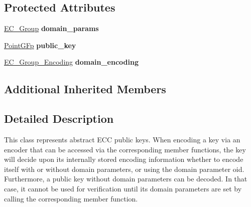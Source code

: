 \subsection*{Protected Attributes}
\begin{DoxyCompactItemize}
\item 
\hypertarget{classBotan_1_1EC__PublicKey_a7b8f5a600f52f9198b57f4015a3e243e}{\hyperlink{classBotan_1_1EC__Group}{E\-C\-\_\-\-Group} {\bfseries domain\-\_\-params}}\label{classBotan_1_1EC__PublicKey_a7b8f5a600f52f9198b57f4015a3e243e}

\item 
\hypertarget{classBotan_1_1EC__PublicKey_ac78cc6c6778686ec42f3b18391a1e91f}{\hyperlink{classBotan_1_1PointGFp}{Point\-G\-Fp} {\bfseries public\-\_\-key}}\label{classBotan_1_1EC__PublicKey_ac78cc6c6778686ec42f3b18391a1e91f}

\item 
\hypertarget{classBotan_1_1EC__PublicKey_abfa9dae43f5499c983d87a4081510046}{\hyperlink{namespaceBotan_ad0ee6307c8f311388a2bc00426a7f858}{E\-C\-\_\-\-Group\-\_\-\-Encoding} {\bfseries domain\-\_\-encoding}}\label{classBotan_1_1EC__PublicKey_abfa9dae43f5499c983d87a4081510046}

\end{DoxyCompactItemize}
\subsection*{Additional Inherited Members}


\subsection{Detailed Description}
This class represents abstract E\-C\-C public keys. When encoding a key via an encoder that can be accessed via the corresponding member functions, the key will decide upon its internally stored encoding information whether to encode itself with or without domain parameters, or using the domain parameter oid. Furthermore, a public key without domain parameters can be decoded. In that case, it cannot be used for verification until its domain parameters are set by calling the corresponding member function. 

